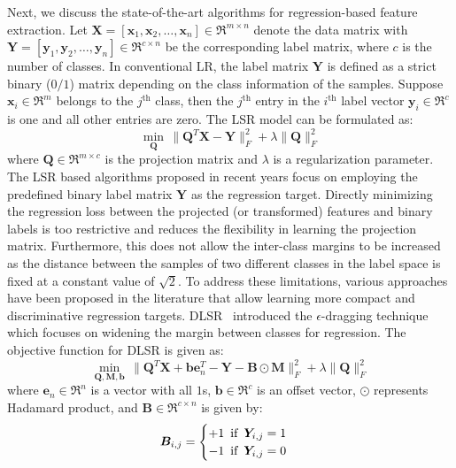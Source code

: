 Next, we discuss the state-of-the-art algorithms for regression-based feature extraction. Let $\bm{X}=[\bm{x}_{1}, \bm{x}_{2}, \dots, \bm{x}_{n}] \in \Re^{m \times n}$ denote the data matrix with $\bm{Y} = \left[ \bm{y}_{1}, \bm{y}_{2}, \dots, \bm{y}_{n} \right]\in \Re^{c \times n}$ be the corresponding label matrix, where $c$ is the number of classes. In conventional LR, the label matrix $\bm{Y}$ is defined as a strict binary ($0/1$) matrix depending on the class information of the samples. Suppose $\bm{x}_{i} \in \Re^{m}$ belongs to the $j^{\text{th}}$ class, then the $j^{\text{th}}$ entry in the $i^{\text{th}}$ label vector $\bm{y}_{i} \in \Re^{c}$ is one and all other entries are zero. The LSR model can be formulated as:
\begin{equation}
    \label{eq: LSR}
    \min_{\bm{Q}} \, \|\bm{Q}^{T}\bm{X} - \bm{Y} \|_{F}^{2} + \lambda \| \bm{Q}\|_{F}^{2}
\end{equation}
%
where $\bm{Q}\in \Re^{m \times c}$ is the projection matrix and $\lambda$ is a regularization parameter. The LSR based algorithms proposed in recent years focus on employing the predefined binary label matrix $\bm{Y}$ as the regression target. Directly minimizing the regression loss between the projected (or transformed) features and binary labels is too restrictive and reduces the flexibility in learning the projection matrix. Furthermore, this does not allow the inter-class margins to be increased as the distance between the samples of two different classes in the label space is fixed at a constant value of $\sqrt{2}$. To address these limitations, various approaches have been proposed in the literature that allow learning more compact and discriminative regression targets. DLSR~\cite{DLSR} introduced the $\epsilon$-dragging technique which focuses on widening the margin between classes for regression. The objective function for DLSR is given as:
%  
\begin{equation}
    \label{eq: DLSR_obj}
     \min_{\bm{Q},\bm{M},\bm{b}}\, \| \bm{Q}^{T} \bm{X} + \bm{b} \bm{e}_{n}^{T}  - \bm{Y} - \bm{B}\odot \bm{M} \|_{F}^{2} + \lambda  \lVert\bm{Q}\rVert_{F}^{2}
\end{equation}
%
where $\bm{e}_{n} \in \Re^{n}$ is a vector with all $1$s, $\bm{b} \in \Re^{c}$ is an offset vector, $\odot$ represents Hadamard product, and $\bm{B} \in \Re^{c \times n}$ is given by:
\begin{equation}
    \bm{B}_{i,j} = \begin{cases}
    +1 \enskip \text{if} \enskip \bm{Y}_{i,j} = 1 \\
    -1 \enskip \text{if} \enskip \bm{Y}_{i,j} = 0
    \end{cases}
\end{equation}
